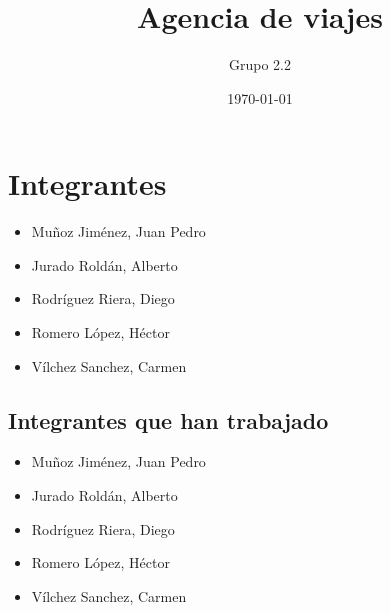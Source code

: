 \documentclass[a4paper,10pt]{article}
\title{Agencia de viajes}
\author{Grupo 2.2}
\date{\today}
\begin{document}
\maketitle
\pagebreak


\section{Integrantes}
\begin{itemize}
	\item Muñoz Jiménez, Juan Pedro
	\item Jurado Roldán, Alberto
	\item Rodríguez Riera, Diego
	\item Romero López, Héctor
	\item Vílchez Sanchez, Carmen
\end{itemize}

\subsection{Integrantes que han trabajado}
\begin{itemize}
	\item Muñoz Jiménez, Juan Pedro
	\item Jurado Roldán, Alberto
	\item Rodríguez Riera, Diego
	\item Romero López, Héctor
	\item Vílchez Sanchez, Carmen
\end{itemize}

\pagebreak
\end{document}
